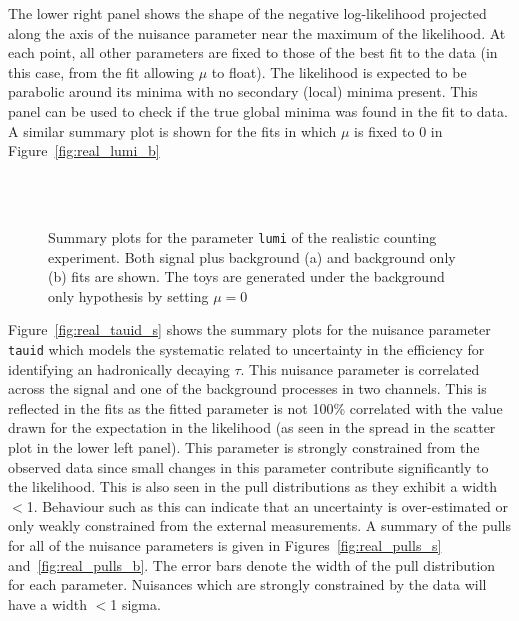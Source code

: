The lower right panel shows the shape of the negative log-likelihood projected along the axis of the nuisance parameter near the maximum 
of the likelihood. At each point, all other parameters are fixed to those of the best fit to the data (in this case, from the fit allowing $\mu$ to float).
The likelihood is expected to be parabolic around its minima with no secondary (local) minima present. This panel can be used to check if the true global 
minima was found in the fit to data. A similar summary plot is shown for the fits in which $\mu$ is fixed to 0 in Figure~\ref{fig:real_lumi_b}


\begin{figure*}[hbtp]
  \begin{center}
    \\
    \\
    \caption{Summary plots for the parameter \texttt{lumi} of the realistic counting experiment. Both signal plus background (a) and 
background only (b) fits are shown. The toys are generated under the background only hypothesis by setting $\mu=0$}
  \end{center}
\end{figure*}


Figure~\ref{fig:real_tauid_s} shows the summary plots for the nuisance parameter \texttt{tauid} which models the systematic related to uncertainty in the
efficiency for identifying an hadronically decaying $\tau$. This nuisance parameter is correlated across the signal and one of the background processes
in two channels. This is reflected in the fits as the fitted parameter is not 100\% correlated with the value drawn for the expectation in the likelihood
(as seen in the spread in the scatter plot in the lower left panel).
This parameter is strongly constrained from the observed data since small changes in this parameter contribute significantly to the likelihood.
This is also seen in the pull distributions as they exhibit a width $<$1. Behaviour such as this can indicate that an uncertainty is over-estimated or
only weakly constrained from the external measurements. A summary of the pulls for all of the nuisance parameters is given in 
Figures~\ref{fig:real_pulls_s} and~\ref{fig:real_pulls_b}.
The error bars denote the width of the pull distribution for each parameter. Nuisances which are strongly constrained by the data will have a width $<$1 sigma.

